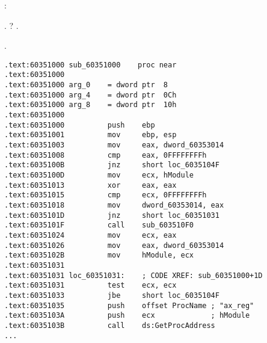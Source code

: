 :



.
? 
.

  .

%

\begin{lstlisting}
.text:60351000 sub_60351000    proc near
.text:60351000
.text:60351000 arg_0    = dword ptr  8
.text:60351000 arg_4    = dword ptr  0Ch
.text:60351000 arg_8    = dword ptr  10h
.text:60351000
.text:60351000          push    ebp
.text:60351001          mov     ebp, esp
.text:60351003          mov     eax, dword_60353014
.text:60351008          cmp     eax, 0FFFFFFFFh
.text:6035100B          jnz     short loc_6035104F
.text:6035100D          mov     ecx, hModule
.text:60351013          xor     eax, eax
.text:60351015          cmp     ecx, 0FFFFFFFFh
.text:60351018          mov     dword_60353014, eax
.text:6035101D          jnz     short loc_60351031
.text:6035101F          call    sub_603510F0
.text:60351024          mov     ecx, eax
.text:60351026          mov     eax, dword_60353014
.text:6035102B          mov     hModule, ecx
.text:60351031
.text:60351031 loc_60351031:    ; CODE XREF: sub_60351000+1D
.text:60351031          test    ecx, ecx
.text:60351033          jbe     short loc_6035104F
.text:60351035          push    offset ProcName ; "ax_reg"
.text:6035103A          push    ecx             ; hModule
.text:6035103B          call    ds:GetProcAddress
...
\end{lstlisting}

